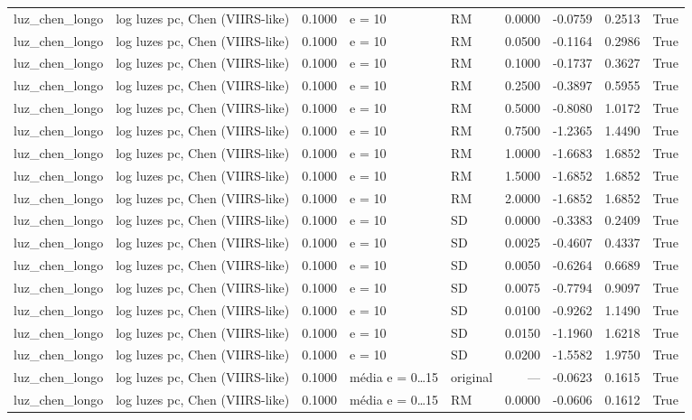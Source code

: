 \begin{table}
{\begin{tabular}{llrllrrrr}
luz\_chen\_longo & log luzes pc, Chen (VIIRS-like) & 0.1000 & e = 10 & RM & 0.0000 & -0.0759 & 0.2513 & True \\
luz\_chen\_longo & log luzes pc, Chen (VIIRS-like) & 0.1000 & e = 10 & RM & 0.0500 & -0.1164 & 0.2986 & True \\
luz\_chen\_longo & log luzes pc, Chen (VIIRS-like) & 0.1000 & e = 10 & RM & 0.1000 & -0.1737 & 0.3627 & True \\
luz\_chen\_longo & log luzes pc, Chen (VIIRS-like) & 0.1000 & e = 10 & RM & 0.2500 & -0.3897 & 0.5955 & True \\
luz\_chen\_longo & log luzes pc, Chen (VIIRS-like) & 0.1000 & e = 10 & RM & 0.5000 & -0.8080 & 1.0172 & True \\
luz\_chen\_longo & log luzes pc, Chen (VIIRS-like) & 0.1000 & e = 10 & RM & 0.7500 & -1.2365 & 1.4490 & True \\
luz\_chen\_longo & log luzes pc, Chen (VIIRS-like) & 0.1000 & e = 10 & RM & 1.0000 & -1.6683 & 1.6852 & True \\
luz\_chen\_longo & log luzes pc, Chen (VIIRS-like) & 0.1000 & e = 10 & RM & 1.5000 & -1.6852 & 1.6852 & True \\
luz\_chen\_longo & log luzes pc, Chen (VIIRS-like) & 0.1000 & e = 10 & RM & 2.0000 & -1.6852 & 1.6852 & True \\
luz\_chen\_longo & log luzes pc, Chen (VIIRS-like) & 0.1000 & e = 10 & SD & 0.0000 & -0.3383 & 0.2409 & True \\
luz\_chen\_longo & log luzes pc, Chen (VIIRS-like) & 0.1000 & e = 10 & SD & 0.0025 & -0.4607 & 0.4337 & True \\
luz\_chen\_longo & log luzes pc, Chen (VIIRS-like) & 0.1000 & e = 10 & SD & 0.0050 & -0.6264 & 0.6689 & True \\
luz\_chen\_longo & log luzes pc, Chen (VIIRS-like) & 0.1000 & e = 10 & SD & 0.0075 & -0.7794 & 0.9097 & True \\
luz\_chen\_longo & log luzes pc, Chen (VIIRS-like) & 0.1000 & e = 10 & SD & 0.0100 & -0.9262 & 1.1490 & True \\
luz\_chen\_longo & log luzes pc, Chen (VIIRS-like) & 0.1000 & e = 10 & SD & 0.0150 & -1.1960 & 1.6218 & True \\
luz\_chen\_longo & log luzes pc, Chen (VIIRS-like) & 0.1000 & e = 10 & SD & 0.0200 & -1.5582 & 1.9750 & True \\
luz\_chen\_longo & log luzes pc, Chen (VIIRS-like) & 0.1000 & média e = 0…15 & original & — & -0.0623 & 0.1615 & True \\
luz\_chen\_longo & log luzes pc, Chen (VIIRS-like) & 0.1000 & média e = 0…15 & RM & 0.0000 & -0.0606 & 0.1612 & True \\

\end{tabular}}
\end{table}
